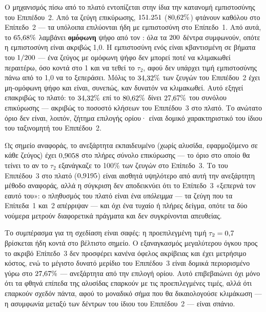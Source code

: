 Ο μηχανισμός πίσω από το πλατό εντοπίζεται στην ίδια την κατανομή εμπιστοσύνης του
Επιπέδου~2.
Από τα \ValSplitSize{} ζεύγη επικύρωσης, $151.251{}$
($80{,}62\%$) φτάνουν καθόλου στο Επίπεδο~2 --- τα υπόλοιπα επιλύονται ήδη
με εμπιστοσύνη στο Επίπεδο~1.
Από αυτά, το $65{,}68\%$ λαμβάνει \textbf{ομόφωνη}
ψήφο από τον \texttt{}: όλα τα $200{}$ δέντρα συμφωνούν,
οπότε η εμπιστοσύνη είναι ακριβώς 1{,}0. Η εμπιστοσύνη ενός  είναι
κβαντισμένη σε βήματα του $1/200{}$ --- ένα ζεύγος με ομόφωνη ψήφο δεν
μπορεί ποτέ να κλιμακωθεί περαιτέρω, όσο κοντά στο 1 και να τεθεί το $\tau_2$, αφού δεν
υπάρχει τιμή εμπιστοσύνης πάνω από το 1{,}0 να το ξεπεράσει.
Μόλις το
$34{,}32\%$ των ζευγών του Επιπέδου~2 έχει μη-ομόφωνη ψήφο και είναι,
συνεπώς, καν δυνατόν να κλιμακωθεί.
Αυτό εξηγεί επακριβώς το πλατό: το
$34{,}32\%$ επί το $80{,}62\%$ δίνει
$27{,}67\%$ του συνόλου επικύρωσης --- ακριβώς το ποσοστό κλήσεων
του Επιπέδου~3 στο πλατό.
Το ανώτατο όριο δεν είναι, λοιπόν, ζήτημα επιλογής ορίου· είναι
δομικό χαρακτηριστικό του ίδιου του ταξινομητή του Επιπέδου~2.

Ως σημείο αναφοράς, το ανεξάρτητα εκπαιδευμένο \texttt{} (χωρίς
αλυσίδα, εφαρμοζόμενο σε κάθε ζεύγος) έχει  $0{,}9058{}$ στο πλήρες
σύνολο επικύρωσης --- το όριο στο οποίο θα τείνει το  αν το $\tau_2$
εξανάγκαζε το 100\% των ζευγών στο Επίπεδο~3.
Το  του Επιπέδου~3 στο πλατό
($0{,}9195{}$) είναι αισθητά υψηλότερο από αυτή την ανεξάρτητη
μέθοδο αναφοράς, αλλά η σύγκριση δεν αποδεικνύει ότι το Επίπεδο~3 «ξεπερνά τον εαυτό του»:
ο πληθυσμός του πλατό είναι ένα \textit{υπόλειμμα} --- τα ζεύγη που τα Επίπεδα~1 και~2
απέρριψαν --- και όχι ένα τυχαίο ή πλήρες δείγμα, οπότε τα δύο νούμερα μετρούν
διαφορετικά πράγματα και δεν συγκρίνονται απευθείας.

Το συμπέρασμα για τη σχεδίαση είναι σαφές: η προεπιλεγμένη τιμή $\tau_2 = 0{,}7{}$
βρίσκεται ήδη κοντά στο βέλτιστο σημείο.
Ο εξαναγκασμός μεγαλύτερου όγκου προς το ακριβό
Επίπεδο~3 δεν προσφέρει κανένα όφελος ακρίβειας και έχει μετρήσιμο κόστος, ενώ το μέγιστο
δυνατό μερίδιο του Επιπέδου~3 είναι δομικά περιορισμένο γύρω στο
$27{,}67\%$ --- ανεξάρτητα από την επιλογή ορίου.
Αυτό επιβεβαιώνει
όχι μόνο ότι τα φθηνά επίπεδα της αλυσίδας επαρκούν με τις προεπιλεγμένες τιμές, αλλά ότι
επαρκούν σχεδόν πάντα, αφού το μοναδικό σήμα που θα δικαιολογούσε κλιμάκωση --- η
ασυμφωνία μεταξύ των δέντρων του ίδιου του Επιπέδου~2 --- είναι σπάνιο.

